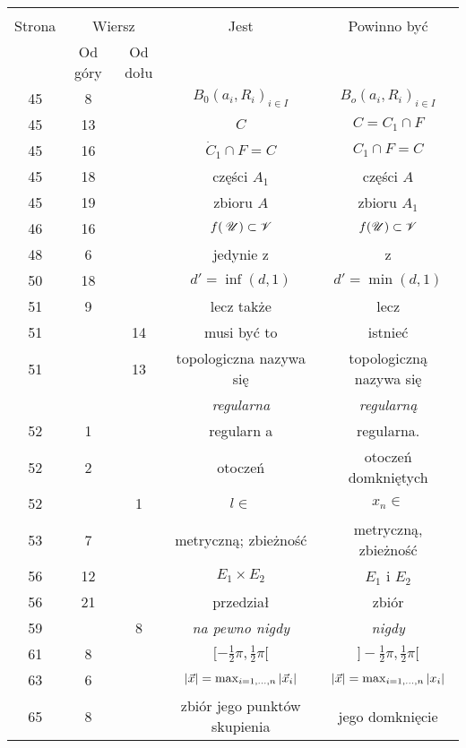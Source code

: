 \documentclass[a4paper,11pt]{article}
\numberwithin{equation}{section}
\begin{document}
\begin{center}
  \begin{tabular}{|c|c|c|c|c|}
    \hline
    & \multicolumn{2}{c|}{} & & \\
    Strona & \multicolumn{2}{c|}{Wiersz} & Jest
                              & Powinno być \\ \cline{2-3}
    & Od góry & Od dołu & & \\
    \hline
    45  &  8 & & $B_{ 0 }( a_{ i }, R_{ i } )_{ i \in I }$
           & $B_{ o }( a_{ i }, R_{ i } )_{ i \in I }$ \\
    45  & 13 & & $C$ & $C = C_{ 1 } \cap F$ \\
    45  & 16 & & $\dot{ C }_{ 1 } \cap F = C$ & $C_{ 1 } \cap F = C$ \\
    45  & 18 & & części $A_{ 1 }$ & części $A$ \\
    45  & 19 & & zbioru $A$ & zbioru $A_{ 1 }$ \\
    46  & 16 & & $f( \: \mathcal{U} ) \subset \mathcal{V}$ & $f( \mathcal{U} ) \subset \mathcal{V}$ \\
    48  &  6 & & jedynie z & z \\
    50  & 18 & & $d' = \inf( d, 1 )$ & $d' = \min( d, 1 )$ \\
    51  &  9 & & lecz także & lecz \\
    51  & & 14 & musi być to & istnieć \\
    51  & & 13 & topologiczna nazywa się & topologiczną nazywa się \\
    & & & \textit{regularna} & \textit{regularną} \\  %
    52  &  1 & & regularn a & regularna. \\
    52  &  2 & & otoczeń & otoczeń domkniętych \\
    52  & &  1 & $l \in$ & $x_{ n } \in$ \\
    53  &  7 & & metryczną; zbieżność & metryczną, zbieżność \\
    56  & 12 & & $E_{ 1 } \times E_{ 2 }$ & $E_{ 1 }$ i $E_{ 2 }$ \\
    56  & 21 & & przedział & zbiór \\
    59  & &  8 & \textit{na pewno nigdy} & \textit{nigdy} \\
    61  &  8 & & $[ -\frac{ 1 }{ 2 } \pi, \frac{ 1 }{ 2 } \pi [$
           & $] -\frac{ 1 }{ 2 } \pi, \frac{ 1 }{ 2 } \pi [$ \\
    63  &  6 & & $| \vec{x} | = \max_{ i = 1, \ldots, n} | \vec{x}_{ i } |$
           & $| \vec{x} | = \max_{ i = 1, \ldots, n} | x_{ i } |$ \\
    65  &  8 & & zbiór jego punktów skupienia & jego domknięcie \\

\end{tabular}
\end{center}
\end{document}
